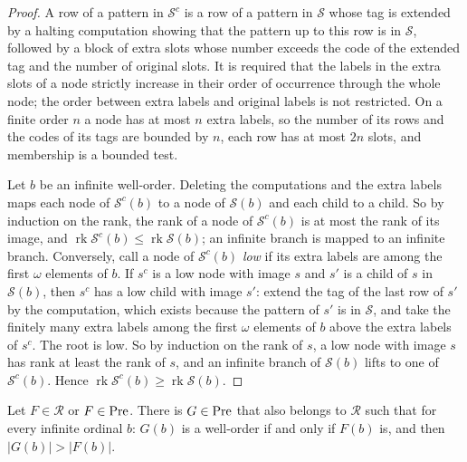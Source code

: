 \documentclass[11pt]{article}
\begin{document}
\begin{proof} A row of a pattern in $\mathcal S^c$ is a row of a pattern in $\mathcal S$ whose tag is extended by
a halting computation showing that the pattern up to this row is in $\mathcal S$, followed by a block of extra
slots whose number exceeds the code of the extended tag and the number of original slots. It is required that the
labels in the extra slots of a node strictly increase in their order of occurrence through the whole node; the
order between extra labels and original labels is not restricted. On a finite order $n$ a node has at most $n$
extra labels, so the number of its rows and the codes of its tags are bounded by $n$, each row has at most $2n$ slots, and
membership is a bounded test.

Let $b$ be an infinite well-order. Deleting the computations and the extra labels maps each node of
$\mathcal S^c(b)$ to a node of $\mathcal S(b)$ and each child to a child. So by induction on the rank, the rank of
a node of $\mathcal S^c(b)$ is at most the rank of its image, and
$\operatorname{rk} \mathcal S^c(b) \le \operatorname{rk} \mathcal S(b)$; an infinite branch is mapped to an
infinite branch. Conversely, call a node of $\mathcal S^c(b)$ \emph{low} if its extra labels are among the first
$\omega$ elements of $b$. If $s^c$ is a low node with image $s$ and $s'$ is a child of $s$ in $\mathcal S(b)$, then
$s^c$ has a low child with image $s'$: extend the tag of the last row of $s'$ by the computation, which exists
because the pattern of $s'$ is in $\mathcal S$, and take the finitely many extra labels among the first $\omega$
elements of $b$ above the extra labels of $s^c$. The root is low. So by induction on the rank of $s$, a low node
with image $s$ has rank at least the rank of $s$, and an infinite branch of $\mathcal S(b)$ lifts to one of
$\mathcal S^c(b)$. Hence $\operatorname{rk} \mathcal S^c(b) \ge \operatorname{rk} \mathcal S(b)$.
\end{proof}

\begin{statement} Let $F \in \mathcal R$ or $F \in \mathrm{Pre}$. There is $G \in \mathrm{Pre}$ that also belongs
to $\mathcal R$ such that for every infinite ordinal $b$: $G(b)$ is a well-order if and only if $F(b)$ is, and then
$|G(b)| > |F(b)|$.
\end{statement}
\end{document}
